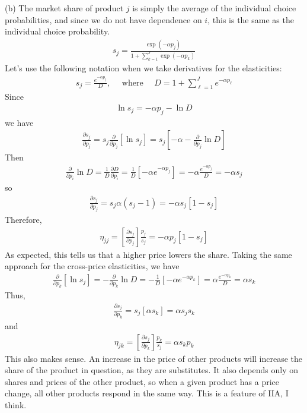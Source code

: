 (b)
The market share of product $j$ is simply the average of the individual choice probabilities, and since we do not have dependence on $i$, this is the same as the individual choice probability.
\begin{align*}
    s_j=\frac{\exp \left(-\alpha p_j\right)}{1+\sum_{k=1}^J \exp \left(-\alpha p_k\right)}
\end{align*}
Let's use the following notation when we take derivatives for the elasticities:
\begin{align*}
s_j=\frac{e^{-\alpha p_j}}{D}, \quad \text { where } \quad D=1+\sum_{\ell=1}^J e^{-\alpha p_{\ell}}
\end{align*}
Since 
\begin{align*}
\ln s_j=-\alpha p_j-\ln D
\end{align*}
we have 
\begin{align*}
\frac{\partial s_j}{\partial p_j}=s_j \frac{\partial}{\partial p_j}\left[\ln s_j\right]=s_j\left[-\alpha-\frac{\partial}{\partial p_j} \ln D\right]
\end{align*}
Then 
\begin{align*}
\frac{\partial}{\partial p_i} \ln D=\frac{1}{D} \frac{\partial D}{\partial p_i}=\frac{1}{D}\left[-\alpha e^{-\alpha p_j}\right]=-\alpha \frac{e^{-\alpha p_j}}{D}=-\alpha s_j
\end{align*}
so
\begin{align*}
\frac{\partial s_j}{\partial p_j}=s_j \alpha\left(s_j-1\right)=-\alpha s_j\left[1-s_j\right]
\end{align*}
Therefore,
\begin{align*}
\eta_{j j}=\left[\frac{\partial s_j}{\partial p_j}\right] \frac{p_j}{s_j}=-\alpha p_j\left[1-s_j\right]
\end{align*}
As expected, this tells us that a higher price lowers the share.
Taking the same approach for the cross-price elasticities, we have
\begin{align*}
\frac{\partial}{\partial p_k}\left[\ln s_j\right]=-\frac{\partial}{\partial p_k} \ln D=-\frac{1}{D}\left[-\alpha e^{-\alpha p_k}\right]=\alpha \frac{e^{-\alpha p_k}}{D}=\alpha s_k
\end{align*}
Thus,
\begin{align*}
\frac{\partial s_j}{\partial p_k}=s_j\left[\alpha s_k\right]=\alpha s_j s_k
\end{align*}
and
\begin{align*}
\eta_{j k}=\left[\frac{\partial s_j}{\partial p_k}\right] \frac{p_k}{s_j}=\alpha s_k p_k
\end{align*}
This also makes sense. An increase in the price of other products will increase the share of the product in question, as they are substitutes.
It also depends only on shares and prices of the other product, so when a given product has a price change, all other products respond in the same way.
This is a feature of IIA, I think.

